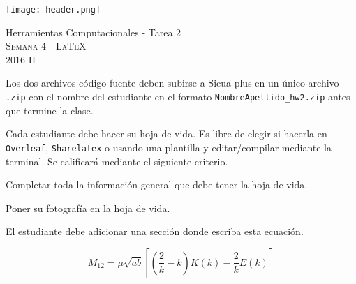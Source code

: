 \documentclass[11pt,letterpaper]{exam}
\begin{document}
\begin{center}

\texttt{[image: header.png]}

\vspace{1.0cm}
{\Large Herramientas Computacionales - Tarea 2} \\
\textsc{Semana 4 - \LaTeX}\\
2016-II\\
\end{center}



\vspace{0.5cm}

\noindent
Los dos archivos c\'odigo fuente deben subirse a Sicua plus en un \'unico archivo
\verb".zip" con el nombre del estudiante en el formato \verb"NombreApellido_hw2.zip" antes que termine la clase.

Cada estudiante debe hacer su hoja de vida. Es libre de elegir si hacerla en \verb'Overleaf', \verb'Sharelatex' o usando una plantilla y editar/compilar mediante la terminal. Se calificar\'a mediante el siguiente criterio.

\vspace{0.5cm}

\begin{questions}
 

Completar toda la informaci\'on general que debe tener la hoja de vida.


Poner su fotograf\'ia en la hoja de vida.


El estudiante debe adicionar una secci\'on donde escriba esta ecuaci\'on.

\begin{equation*}
M_{12} = \mu\sqrt{ab}[(\frac{2}{k}-k)K(k)-\frac{2}{k}E(k)]
\end{equation*}

\end{questions}
\end{document}
